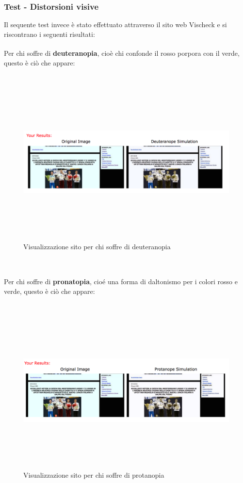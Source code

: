 	\subsubsection {Test - Distorsioni visive}
	Il sequente test invece \`e  stato effettuato attraverso il sito web Vischeck e si riscontrano i seguenti risultati:
	\\
	\\ Per chi soffre di \textbf{deuteranopia}, cio\`e chi confonde il rosso porpora con il verde, questo \`e ci\`o che appare:
	\\
	\\ 
	\begin{figure}[h]
		\centering
		\includegraphics[width=150mm, height=85mm]{images/contrasto_pagina_deuteranope.png}
		\caption{Visualizzazione sito per chi soffre di deuteranopia}
	\end{figure}	
	\\
	\\ Per chi soffre di \textbf{pronatopia}, cio\'e una forma di daltonismo per i colori rosso e verde,  questo \`e ci\`o che appare:
	\\
	\\ 
	\begin{figure}[h]
		\centering
		\includegraphics[width=150mm, height=85mm]{images/contrasto_pagina_protanope.png}
		\caption{Visualizzazione sito per chi soffre di protanopia}
	\end{figure}
